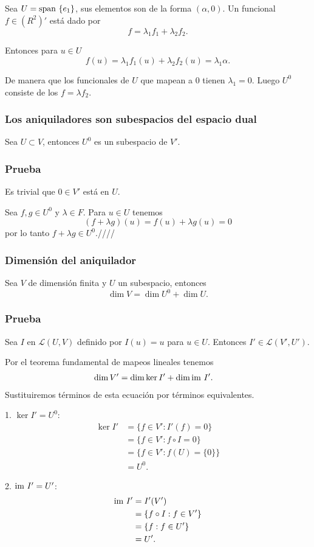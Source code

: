 \documentclass{article}
\begin{document}
Sea $U=\text{span }\{e_1\}$, sus elementos son de la forma $(\alpha,0)$.
Un funcional $f\in (R^2)'$ está dado por
$$f=\lambda_1 f_1 + \lambda_2 f_2.$$

Entonces para $u\in U$
$$f(u)=\lambda_1 f_1(u) + \lambda_2 f_2(u) = \lambda_1\alpha.$$

De manera que los funcionales de $U$ que mapean a $0$ tienen 
$\lambda_1=0$. Luego $U^0$ consiste de los $f=\lambda f_2$.
\newpage

\subsubsection{Los aniquiladores son subespacios del espacio dual}
Sea $U\subset V$, entonces $U^0$ es un subespacio de $V'$.
\subsubsection*{Prueba}
Es trivial que $0\in V'$ está en $U$.

Sea $f,g\in U^0$ y $\lambda\in F$. Para $u\in U$ tenemos
$$(f+\lambda g)(u)=f(u)+\lambda g(u) = 0$$
por lo tanto $f+\lambda g \in U^0$.\hfill ////

\subsubsection{Dimensión del aniquilador}
Sea $V$ de dimensión finita y $U$ un subespacio, entonces
$$\dim V = \dim U^0 + \dim U.$$
\subsubsection*{Prueba}
Sea $I$ en $\mathcal{L}(U, V)$ definido por $I(u)=u$
para $u\in U$. Entonces $I'\in\mathcal{L}(V', U')$.

Por el teorema fundamental de
mapeos lineales tenemos
\begin{align}
    \dim V' &= \dim\ker I' + \dim\text{im } I'.
\end{align}
Sustituiremos términos de esta ecuación por términos
equivalentes.

1. $\ker I' = U^0$:
\begin{align*}
    \ker I' &= \{f\in V': I'(f)=0\}\\
    &= \{f\in V': f\circ I=0\}\\
    &= \{f\in V': f(U)=\{0\}\}\\
    &= U^0.
\end{align*}

2. $\text{im } I' = U'$:
\begin{align*}
    \text{im } I' &= I'(V')\\
    &=\{f\circ I: f\in V'\}\\
    &=\{f: f\in U'\}\\
    &=U'.
\end{align*}
\end{document}
